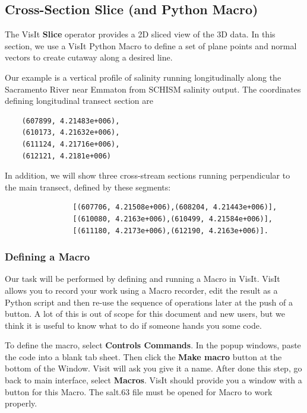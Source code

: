 \documentclass[12pt]{report}
\begin{document}
	 \subsection{Cross-Section Slice (and Python Macro)}
	
	  The VisIt {\bf Slice} operator provides a 2D sliced view of the 3D data. 
		In this section, we use a VisIt Python Macro to define a set of plane points and normal vectors to create cutaway along a desired line. 
		
		Our example is a vertical profile of salinity running longitudinally along the Sacramento River 
		near Emmaton from SCHISM salinity output. The coordinates defining longitudinal transect section are
\begin{verbatim}
    (607899, 4.21483e+006),
    (610173, 4.21632e+006),
    (611124, 4.21716e+006),
    (612121, 4.2181e+006)
\end{verbatim}
			
    In addition, we will show three cross-stream sections running perpendicular to the main transect,
		defined by these segments:
\begin{verbatim}
				[(607706, 4.21508e+006),(608204, 4.21443e+006)],
				[(610080, 4.2163e+006),(610499, 4.21584e+006)],
				[(611180, 4.2173e+006),(612190, 4.2163e+006)].
\end{verbatim}
    
\subsubsection{Defining a Macro}
Our task will be performed by defining and running a Macro in VisIt. 
VisIt allows you to record your work using a Macro recorder, edit the result as a Python script
and then re-use the sequence of operations later at the push of a button. 
A lot of this is out of scope for this document and new users, but we think it is useful 
to know what to do if someone hands you some code.

To define the macro, select {\bf Controls \textrightarrow Commands}. In the popup windows, paste the code into a blank tab sheet.  Then click the {\bf Make macro} button at the bottom of the Window.  Visit will ask you give it a name. After done this step, go back to main interface, select {\bf Macros}. VisIt should provide you a window with a button for this Macro. The salt.63 file must be opened for Macro to work properly.		
		
		  \clearpage
      
				
\end{document}
